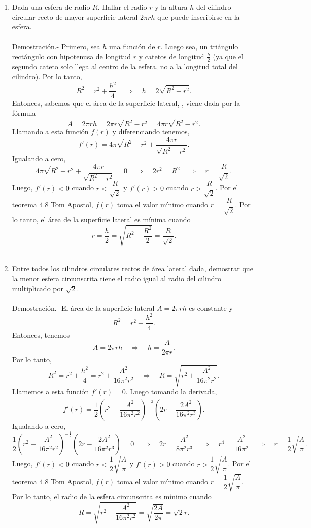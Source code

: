 \begin{enumerate}[\bfseries 1.]
    \item Dada una esfera de radio $R$. Hallar el radio $r$ y la altura $h$ del cilindro circular recto de mayor superficie lateral $2\pi rh$ que puede inscribirse en la esfera.\\\\
	Demostración.-\; Primero, sea $h$ una función de $r$. Luego sea, un triángulo rectángulo con hipotenusa de longitud $r$ y catetos de longitud $\frac{h}{2}$ (ya que el segundo cateto solo llega al centro de la esfera, no a la longitud total del cilindro). Por lo tanto,
	$$R^2=r^2+\dfrac{h^2}{4}\quad \Rightarrow \quad h=2\sqrt{R^2-r^2}.$$
	Entonces, sabemos que el área de la superficie lateral, , viene dada por la fórmula
	$$A=2 \pi rh = 2\pi r\sqrt{R^2-r^2}=4\pi r\sqrt{R^2-r^2}.$$
	Llamando a esta función $f(r)$ y diferenciando tenemos,
	$$f'(r)=4\pi \sqrt{R^2-r^2}+\dfrac{4\pi r}{\sqrt{R^2-r^2}}.$$
	Igualando a cero,
	$$4\pi \sqrt{R^2-r^2}+\dfrac{4\pi r}{\sqrt{R^2-r^2}}=0\quad \Rightarrow \quad 2r^2=R^2\quad \Rightarrow \quad r=\dfrac{R}{\sqrt{2}}.$$
	Luego, $f'(r)<0$ cuando $r<\dfrac{R}{\sqrt{2}}$ y $f'(r)>0$ cuando $r>\dfrac{R}{\sqrt{2}}$. Por el teorema 4.8 Tom Apostol, $f(r)$ toma el valor mínimo cuando $r=\dfrac{R}{\sqrt{2}}.$ Por lo tanto, el área de la superficie lateral es mínima cuando 
	$$r=\dfrac{h}{2}=\sqrt{R^2-\dfrac{R^2}{2}}=\dfrac{R}{\sqrt{2}}.$$\\

    \item Entre todos los cilindros circulares rectos de área lateral dada, demostrar que la menor
	esfera circunscrita tiene el radio igual al radio del cilindro multiplicado por $\sqrt{2}.$\\\\
	Demostración.-\; El área de la superficie lateral $A=2\pi rh$ es constante y 
	$$R^2=r^2+\dfrac{h^2}{4}.$$
	Entonces, tenemos
	$$A=2\pi rh \quad \Rightarrow \quad h=\dfrac{A}{2\pi r}.$$
	Por lo tanto,
	$$R^2=r^2+\dfrac{h^2}{4}=r^2+\dfrac{A^2}{16\pi^2 r^2} \quad \Rightarrow \quad R=\sqrt{r^2+\dfrac{A^2}{16\pi^2r^2}}.$$
	Llamemos a esta función $f'(r)=0$. Luego tomando la derivada,
	$$f'(r)=\dfrac{1}{2}\left(r^2+\dfrac{A^2}{16\pi^2 r^2}\right)^{-\frac{1}{2}}\left(2r-\dfrac{2A^2}{16\pi^2 r^3}\right).$$
	Igualando a cero,
	$$\dfrac{1}{2}\left(r^2+\dfrac{A^2}{16\pi^2 r^2}\right)^{-\frac{1}{2}}\left(2r-\dfrac{2A^2}{16\pi^2 r^3}\right)=0\quad \Rightarrow \quad 2r=\dfrac{A^2}{8\pi^2r^3} \quad \Rightarrow \quad r^4=\dfrac{A^2}{16\pi^2}\quad \Rightarrow \quad r=\dfrac{1}{2}\sqrt{\dfrac{A}{\pi}}.$$
	Luego, $f'(r)<0$ cuando $r<\dfrac{1}{2}\sqrt{\dfrac{A}{\pi}}$ y $f'(r)>0$ cuando $r>\dfrac{1}{2}\sqrt{\dfrac{A}{\pi}}$. Por el teorema 4.8 Tom Apostol, $f(r)$ toma el valor mínimo cuando $r=\dfrac{1}{2}\sqrt{\dfrac{A}{\pi}}.$ Por lo tanto, el radio de la esfera circunscrita es mínimo cuando
	$$R=\sqrt{r^2+\dfrac{A^2}{16\pi^2r^2}}=\sqrt{\dfrac{2A}{2\pi}}=\sqrt{2}r.$$\\


\end{enumerate}
